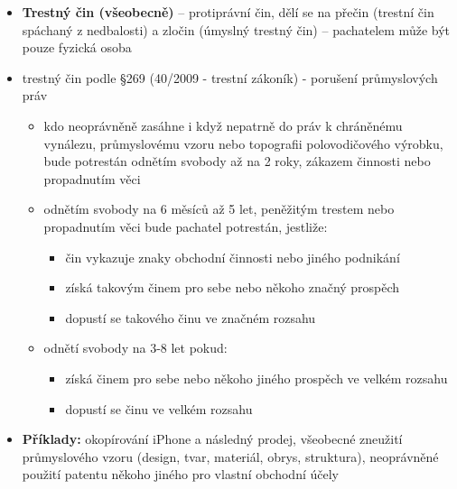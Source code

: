 \begin{itemize}
    \item \textbf{Trestný čin (všeobecně)} – protiprávní čin, dělí se na přečin (trestní čin spáchaný
    z nedbalosti) a zločin (úmyslný trestný čin) – pachatelem může být pouze fyzická
    osoba
    \item trestný čin podle §269 (40/2009 - trestní zákoník) - porušení průmyslových
    práv
    \begin{itemize}
        \item kdo neoprávněně zasáhne i když nepatrně do práv k chráněnému
        vynálezu, průmyslovému vzoru nebo topografii polovodičového výrobku,
        bude potrestán odnětím svobody až na 2 roky, zákazem činnosti nebo
        propadnutím věci
        \item odnětím svobody na 6 měsíců až 5 let, peněžitým trestem nebo
        propadnutím věci bude pachatel potrestán, jestliže:
        \begin{itemize}
            \item čin vykazuje znaky obchodní činnosti nebo jiného podnikání
            \item získá takovým činem pro sebe nebo někoho značný prospěch
            \item dopustí se takového činu ve značném rozsahu
        \end{itemize}
        \item odnětí svobody na 3-8 let pokud:
        \begin{itemize}
            \item získá činem pro sebe nebo někoho jiného prospěch ve velkém
            rozsahu
            \item dopustí se činu ve velkém rozsahu
        \end{itemize}
    \end{itemize}
    \item \textbf{Příklady:} okopírování iPhone a následný prodej, všeobecné zneužití
    průmyslového vzoru (design, tvar, materiál, obrys, struktura), neoprávněné použití
    patentu někoho jiného pro vlastní obchodní účely
\end{itemize}



